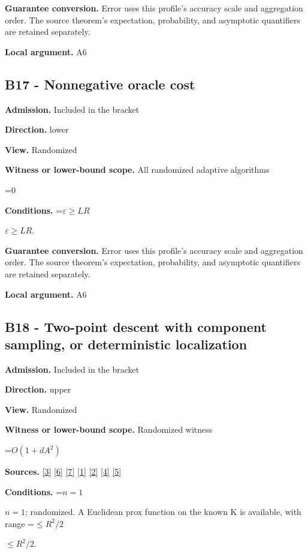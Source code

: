 \documentclass[10pt,a4paper]{article}
\newcommand{\AtlasMath}[1]{\par\begingroup\centering\setbox0=\hbox{$\displaystyle #1$}\ifdim\wd0>1.4\linewidth\typeout{ATLAS WIDE FORMULA: \the\wd0}\fi\ifdim\wd0>\linewidth\resizebox{\linewidth}{!}{\box0}\else\box0\fi\par\endgroup}
\newcommand{\AtlasInlineMath}[1]{\begingroup\setbox0=\hbox{$#1$}\ifdim\wd0>.4\linewidth\endgroup\AtlasMath{#1}\else\endgroup$#1$\fi}
\begin{document}
\textbf{Guarantee conversion.} Error uses this profile's accuracy scale and aggregation order. The source theorem's expectation, probability, and asymptotic quantifiers are retained separately.

\textbf{Local argument.} A6

\subsection{B17 - Nonnegative oracle cost}
\textbf{Admission.} Included in the bracket

\textbf{Direction.} lower

\textbf{View.} Randomized

\textbf{Witness or lower-bound scope.} All randomized adaptive algorithms

\AtlasMath{0}
\textbf{Conditions.} \AtlasInlineMath{\varepsilon\ge LR}.

\textbf{Guarantee conversion.} Error uses this profile's accuracy scale and aggregation order. The source theorem's expectation, probability, and asymptotic quantifiers are retained separately.

\textbf{Local argument.} A6

\subsection{B18 - Two-point descent with component sampling, or deterministic localization}
\textbf{Admission.} Included in the bracket

\textbf{Direction.} upper

\textbf{View.} Randomized

\textbf{Witness or lower-bound scope.} Randomized witness

\AtlasMath{O(1+dA^2)}
\textbf{Sources.} \href{https://jmlr.org/papers/volume18/16-632/16-632.pdf}{[3]} \href{https://arxiv.org/abs/1802.09022}{[6]} \href{https://proceedings.neurips.cc/paper_files/paper/2022/file/329ef22fd8cb68223d5df09a037f7dd9-Paper-Conference.pdf}{[7]} \href{https://arxiv.org/html/2610.00345v1}{[1]} \href{https://arxiv.org/html/2607.16558v2}{[2]} \href{https://www.mathnet.ru/php/archive.phtml?jrnid=mzm&option_lang=eng&paperid=1697&wshow=paper}{[4]} \href{https://arxiv.org/abs/2109.08858}{[5]}

\textbf{Conditions.} \AtlasInlineMath{n=1}; randomized. A Euclidean prox function on the known K is available, with range \AtlasInlineMath{\le R^2/2}.
\end{document}
